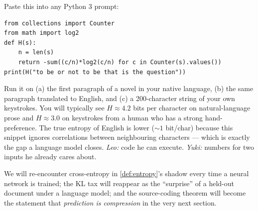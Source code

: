 \begin{activity}
\label{act:python}
Paste this into any Python 3 prompt:
\begin{verbatim}
from collections import Counter
from math import log2
def H(s):
    n = len(s)
    return -sum((c/n)*log2(c/n) for c in Counter(s).values())
print(H("to be or not to be that is the question"))
\end{verbatim}
Run it on (a) the first paragraph of a novel in your native
language, (b) the same paragraph translated to English, and (c) a
200-character string of your own keystrokes. You will typically see
$H \approx 4.2$ bits per character on natural-language prose and
$H \approx 3.0$ on keystrokes from a human who has a strong
hand-preference. The true entropy of English is lower
(${\sim}1$ bit/char) because this snippet ignores correlations
between neighbouring characters --- which is exactly the gap a
language model closes.
\textit{Leo:} code he can execute. \textit{Yuki:} numbers for two
inputs he already cares about.
\end{activity}

\begin{aside}
We will re-encounter cross-entropy in \cref{def:entropy}'s shadow
every time a neural network is trained; the KL tax will reappear as
the ``surprise'' of a held-out document under a language model; and
the source-coding theorem will become the statement that
\emph{prediction is compression} in the very next section.
\end{aside}
